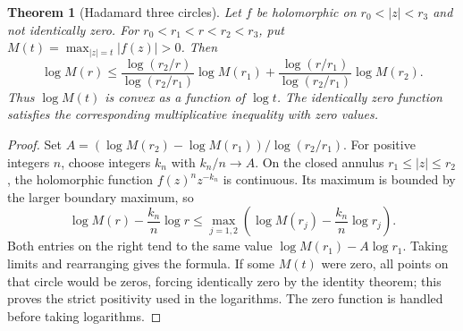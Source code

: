 \documentclass[11pt,a4paper,openany]{book}
\newtheorem{theorem}{Theorem}[chapter]
\theoremstyle{definition}
\theoremstyle{remark}\newtheorem{remark}[theorem]{Remark}
\newcommand{\family}[1]{}
\begin{document}
\begin{theorem}[Hadamard three circles]\family{D12.06.05}\label{d12:06-05}
Let \(f\) be holomorphic on \(r_0<|z|<r_3\) and not identically zero.
For \(r_0<r_1<r<r_2<r_3\), put
\(M(t)=\max_{|z|=t}|f(z)|>0\).
Then
\[
 \log M(r)\le
 \frac{\log(r_2/r)}{\log(r_2/r_1)}\log M(r_1)
 +\frac{\log(r/r_1)}{\log(r_2/r_1)}\log M(r_2).
\]
Thus \(\log M(t)\) is convex as a function of \(\log t\).
The identically zero function satisfies the corresponding multiplicative
inequality with zero values.
\end{theorem}
\begin{proof}
Set
\(A=(\log M(r_2)-\log M(r_1))/\log(r_2/r_1)\).
For positive integers \(n\), choose integers \(k_n\) with
\(k_n/n\to A\). On the closed annulus \(r_1\le|z|\le r_2\),
the holomorphic function \(f(z)^n z^{-k_n}\) is continuous.
Its maximum is bounded by the larger boundary maximum, so
\[
 \log M(r)-\frac{k_n}{n}\log r
 \le\max_{j=1,2}\left(\log M(r_j)-\frac{k_n}{n}\log r_j\right).
\]
Both entries on the right tend to the same value
\(\log M(r_1)-A\log r_1\). Taking limits and rearranging gives the formula.
If some \(M(t)\) were zero, all points on that circle would be zeros,
forcing identically zero by the identity theorem; this proves the strict
positivity used in the logarithms. The zero function is handled before
taking logarithms.
\end{proof}
\end{document}
